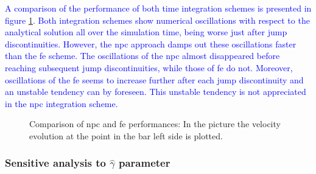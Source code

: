\documentclass[preprint,12pt,a4paper]{elsarticle}
\begin{document}
\textcolor{blue}{A comparison of the performance of both time integration schemes is presented in figure \ref{fig:Dyka-NPC-FE}. Both integration schemes show numerical oscillations with respect to the analytical solution all over the simulation time, being worse just after jump discontinuities. However, the \acrshort{npc} approach damps out these oscillations faster than the \acrshort{fe} scheme. The oscillations of the \acrshort{npc} almost disappeared before reaching subsequent jump discontinuities, while those of \acrshort{fe} do not. Moreover, oscillations of the \acrshort{fe} seems to increase further after each jump discontinuity and an unstable tendency can by foreseen. This unstable tendency is not appreciated in the \acrshort{npc} integration scheme.} 
\begin{figure}
  \centering
  \caption{Comparison of \acrshort{npc} and \acrshort{fe}
      performances: In the picture the velocity evolution at the point in the bar left side
    is plotted.}
  \label{fig:Dyka-NPC-FE}
\end{figure}

\subsubsection{Sensitive analysis to \texorpdfstring{$\widehat{\gamma}$}{gamma}  parameter}
\label{sec:Sensitive-analysis-gamma}
\end{document}
